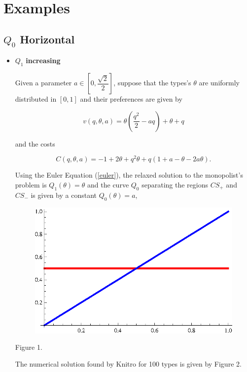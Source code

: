 
\section{Examples}
\label{sec:examp}
\subsection{$Q_{0}$ Horizontal}
\begin{itemize}
 \item $Q_{1}$ \bf{increasing} \normalfont


Given a parameter $a\in[0,\dfrac{\sqrt{2}}{2}]$, suppose that the types's $\theta$ are uniformly distributed in $[0,1]$ and their preferences  are given by

 $$v(q,\theta,a)= \theta(\dfrac{q^{2}}{2} - aq) + \theta + q$$

and the costs

 $$C(q,\theta,a)= -1 + 2\theta + q^{2}\theta + q(1 + a - \theta - 2a\theta).$$

Using the  Euler Equation  (\ref{euler}), the relaxed solution to the monopolist's problem is $Q_{1}(\theta)=\theta$ and the  curve $Q_{0}$ 
separating the regions $CS_{+}$ and $CS_{-}$ is given by a constant $Q_{0}(\theta)=a$, 

\newpage

\begin{center}
\begin{figure}[h!]
\includegraphics[scale=0.8]{hor1.eps} 
\end{figure}
Figure 1.
\end{center}

The numerical solution found by Knitro for 100 types is given by Figure 2.\\


\end{itemize}
